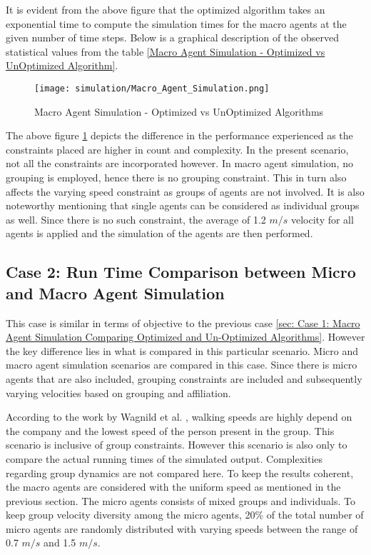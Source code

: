 It is evident from the above figure that the optimized algorithm takes an exponential time to compute the simulation times for the macro agents at the given number of time steps. Below is a graphical description of the observed statistical values from the table \ref{Macro Agent Simulation - Optimized vs UnOptimized Algorithm}.

\begin{figure}[H]
  \centering
  \texttt{[image: simulation/Macro\_Agent\_Simulation.png]}
  \caption{Macro Agent Simulation - Optimized vs UnOptimized Algorithms}
  \label{Macro Agent Simulation}
\end{figure}

The above figure \ref{Macro Agent Simulation} depicts the difference in the performance experienced as the constraints placed are higher in count and complexity. In the present scenario, not all the constraints are incorporated however. In macro agent simulation, no grouping is employed, hence there is no grouping constraint. This in turn also affects the varying speed constraint as groups of agents are not involved. It is also noteworthy mentioning that single agents can be considered as individual groups as well. Since there is no such constraint, the average of 1.2 $m/s$ velocity for all agents is applied and the simulation of the agents are then performed.


\subsection{Case 2: Run Time Comparison between Micro and Macro Agent Simulation}
\label{sec: Case 2: Run Time Comparison between Micro and Macro Agent Simulation}

This case is similar in terms of objective to the previous case \ref{sec: Case 1: Macro Agent Simulation Comparing Optimized and Un-Optimized Algorithms}. However the key difference lies in what is compared in this particular scenario. Micro and macro agent simulation scenarios are compared in this case. Since there is micro agents that are also included, grouping constraints are included and subsequently varying velocities based on grouping and affiliation.

According to the work by Wagnild et al. \cite{ref24}, walking speeds are highly depend on the company and the lowest speed of the person present in the group. This scenario is inclusive of group constraints. However this scenario is also only to compare the actual running times of the simulated output. Complexities regarding group dynamics are not compared here. To keep the results coherent, the macro agents are considered with the uniform speed as mentioned in the previous section. The micro agents consists of mixed groups and individuals. To keep group velocity diversity among the micro agents, 20\% of the total number of micro agents are randomly distributed with varying speeds between the range of 0.7 $m/s$ and 1.5 $m/s$.   

